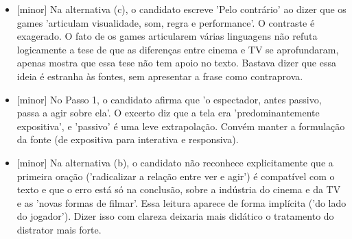 \documentclass{article}%
\begin{document}
\begin{itemize}%
\item%
{[}minor{]} Na alternativa (c), o candidato escreve 'Pelo contrário' ao dizer que os games 'articulam visualidade, som, regra e performance'. O contraste é exagerado. O fato de os games articularem várias linguagens não refuta logicamente a tese de que as diferenças entre cinema e TV se aprofundaram, apenas mostra que essa tese não tem apoio no texto. Bastava dizer que essa ideia é estranha às fontes, sem apresentar a frase como contraprova.%
\item%
{[}minor{]} No Passo 1, o candidato afirma que 'o espectador, antes passivo, passa a agir sobre ela'. O excerto diz que a tela era 'predominantemente expositiva', e 'passivo' é uma leve extrapolação. Convém manter a formulação da fonte (de expositiva para interativa e responsiva).%
\item%
{[}minor{]} Na alternativa (b), o candidato não reconhece explicitamente que a primeira oração ('radicalizar a relação entre ver e agir') é compatível com o texto e que o erro está só na conclusão, sobre a indústria do cinema e da TV e as 'novas formas de filmar'. Essa leitura aparece de forma implícita ('do lado do jogador'). Dizer isso com clareza deixaria mais didático o tratamento do distrator mais forte.%
\end{itemize}%
\end{document}
